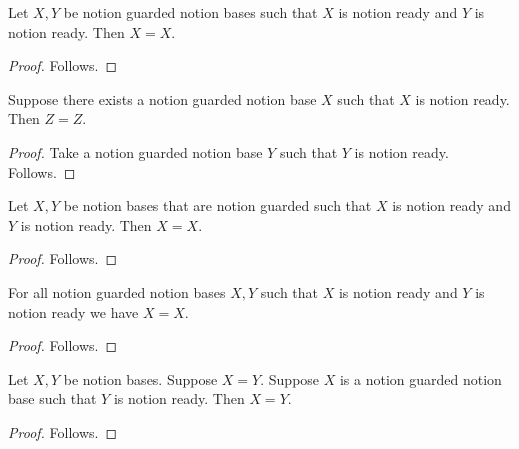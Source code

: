 

\begin{proposition}\label{notion_completed_grouped}
    Let $X,Y$ be notion guarded notion bases such that
        $X$ is notion ready and $Y$ is notion ready.
    Then $X=X$.
\end{proposition}
\begin{proof}
    Follows.
\end{proof}

\begin{proposition}\label{notion_completed_choice}
    Suppose there exists a notion guarded notion base $X$ such that
        $X$ is notion ready.
    Then $Z=Z$.
\end{proposition}
\begin{proof}
    Take a notion guarded notion base $Y$ such that $Y$ is notion ready.
    Follows.
\end{proof}

\begin{proposition}\label{notion_completed_right}
    Let $X,Y$ be notion bases that are notion guarded such that
        $X$ is notion ready and $Y$ is notion ready.
    Then $X=X$.
\end{proposition}
\begin{proof}
    Follows.
\end{proof}

\begin{proposition}\label{notion_completed_universal}
    For all notion guarded notion bases $X,Y$ such that
        $X$ is notion ready and $Y$ is notion ready we have $X=X$.
\end{proposition}
\begin{proof}
    Follows.
\end{proof}

\begin{proposition}\label{notion_completed_equality}
    Let $X,Y$ be notion bases.
    Suppose $X=Y$.
    Suppose $X$ is a notion guarded notion base such that $Y$ is notion ready.
    Then $X=Y$.
\end{proposition}
\begin{proof}
    Follows.
\end{proof}
